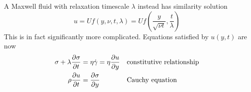 \documentclass{jknotes}
\begin{document}
\begin{center}
\end{center}

A Maxwell fluid with relaxation timescale $\lambda$ instead has similarity
solution
\begin{equation}
	u = Uf(y,\nu,t,\lambda) = Uf(\frac{y}{\sqrt{\nu t}},\frac{t}{\lambda})
\end{equation}
This is in fact significantly more complicated. Equations satisfied by
$u(y,t)$ are now
\begin{align}
	\sigma + \lambda \frac{\partial \sigma}{\partial t} &= \eta \dot{\gamma} = \eta
	\frac{\partial u}{\partial y} &&\text{constitutive relationship} \\
	\rho \frac{\partial u}{\partial t} &= \frac{\partial \sigma}{\partial y} 
									   &&\text{Cauchy equation}
\end{align}
\end{document}
